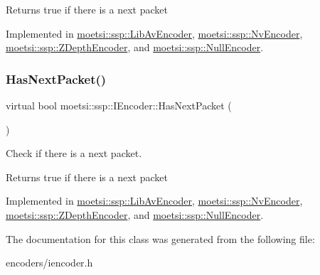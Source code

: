 \begin{DoxyReturn}{Returns}
true if there is a next packet 
\end{DoxyReturn}


Implemented in \hyperlink{classmoetsi_1_1ssp_1_1LibAvEncoder_a306c0935fa37bd35ddfeb8290289e927}{moetsi\+::ssp\+::\+Lib\+Av\+Encoder}, \hyperlink{classmoetsi_1_1ssp_1_1NvEncoder_a4c0874d9d0d767ae7a33fe9c9a1be1de}{moetsi\+::ssp\+::\+Nv\+Encoder}, \hyperlink{classmoetsi_1_1ssp_1_1ZDepthEncoder_ac11aa1369150c2aa5ffa1d70d4e6ad5d}{moetsi\+::ssp\+::\+Z\+Depth\+Encoder}, and \hyperlink{classmoetsi_1_1ssp_1_1NullEncoder_a359eb668c16a1ef7963214f7f6303af4}{moetsi\+::ssp\+::\+Null\+Encoder}.

\mbox{\label{classmoetsi_1_1ssp_1_1IEncoder_a2af8e23d841ef61f6ee4037e56a3694d}} 
\subsubsection{\texorpdfstring{Has\+Next\+Packet()}{HasNextPacket()}\hspace{0.1cm}{\footnotesize\ttfamily [2/2]}}
{\footnotesize\ttfamily virtual bool moetsi\+::ssp\+::\+I\+Encoder\+::\+Has\+Next\+Packet (\begin{DoxyParamCaption}{ }\end{DoxyParamCaption})\hspace{0.3cm}{\ttfamily [pure virtual]}}



Check if there is a next packet. 

\begin{DoxyReturn}{Returns}
true if there is a next packet 
\end{DoxyReturn}


Implemented in \hyperlink{classmoetsi_1_1ssp_1_1LibAvEncoder_a306c0935fa37bd35ddfeb8290289e927}{moetsi\+::ssp\+::\+Lib\+Av\+Encoder}, \hyperlink{classmoetsi_1_1ssp_1_1NvEncoder_a4c0874d9d0d767ae7a33fe9c9a1be1de}{moetsi\+::ssp\+::\+Nv\+Encoder}, \hyperlink{classmoetsi_1_1ssp_1_1ZDepthEncoder_ac11aa1369150c2aa5ffa1d70d4e6ad5d}{moetsi\+::ssp\+::\+Z\+Depth\+Encoder}, and \hyperlink{classmoetsi_1_1ssp_1_1NullEncoder_a359eb668c16a1ef7963214f7f6303af4}{moetsi\+::ssp\+::\+Null\+Encoder}.



The documentation for this class was generated from the following file\+:\begin{DoxyCompactItemize}
\item 
encoders/iencoder.\+h\end{DoxyCompactItemize}
